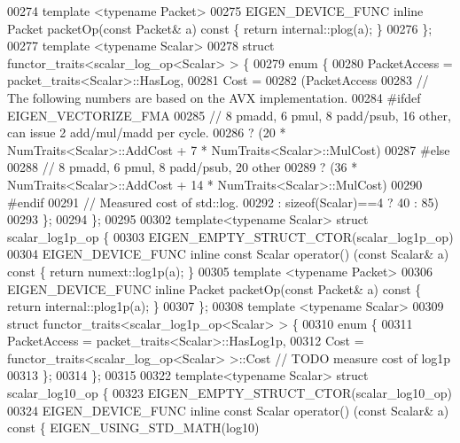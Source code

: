 \begin{DoxyCode}
00274   \textcolor{keyword}{template} <\textcolor{keyword}{typename} Packet>
00275   EIGEN\_DEVICE\_FUNC \textcolor{keyword}{inline} Packet packetOp(\textcolor{keyword}{const} Packet& a)\textcolor{keyword}{ const }\{ \textcolor{keywordflow}{return} internal::plog(a); \}
00276 \};
00277 \textcolor{keyword}{template} <\textcolor{keyword}{typename} Scalar>
00278 \textcolor{keyword}{struct }functor\_traits<scalar\_log\_op<Scalar> > \{
00279   \textcolor{keyword}{enum} \{
00280     PacketAccess = packet\_traits<Scalar>::HasLog,
00281     Cost =
00282     (PacketAccess
00283      \textcolor{comment}{// The following numbers are based on the AVX implementation.}
00284 \textcolor{preprocessor}{#ifdef EIGEN\_VECTORIZE\_FMA}
00285      \textcolor{comment}{// 8 pmadd, 6 pmul, 8 padd/psub, 16 other, can issue 2 add/mul/madd per cycle.}
00286      ? (20 * NumTraits<Scalar>::AddCost + 7 * NumTraits<Scalar>::MulCost)
00287 #\textcolor{keywordflow}{else}
00288      \textcolor{comment}{// 8 pmadd, 6 pmul, 8 padd/psub, 20 other}
00289      ? (36 * NumTraits<Scalar>::AddCost + 14 * NumTraits<Scalar>::MulCost)
00290 \textcolor{preprocessor}{#endif}
00291      \textcolor{comment}{// Measured cost of std::log.}
00292      : \textcolor{keyword}{sizeof}(Scalar)==4 ? 40 : 85)
00293   \};
00294 \};
00295 
00302 \textcolor{keyword}{template}<\textcolor{keyword}{typename} Scalar> \textcolor{keyword}{struct }scalar\_log1p\_op \{
00303   EIGEN\_EMPTY\_STRUCT\_CTOR(scalar\_log1p\_op)
00304   EIGEN\_DEVICE\_FUNC \textcolor{keyword}{inline} \textcolor{keyword}{const} Scalar operator() (\textcolor{keyword}{const} Scalar& a)\textcolor{keyword}{ const }\{ \textcolor{keywordflow}{return} numext::log1p(a); \}
00305   \textcolor{keyword}{template} <\textcolor{keyword}{typename} Packet>
00306   EIGEN\_DEVICE\_FUNC \textcolor{keyword}{inline} Packet packetOp(\textcolor{keyword}{const} Packet& a)\textcolor{keyword}{ const }\{ \textcolor{keywordflow}{return} internal::plog1p(a); \}
00307 \};
00308 \textcolor{keyword}{template} <\textcolor{keyword}{typename} Scalar>
00309 \textcolor{keyword}{struct }functor\_traits<scalar\_log1p\_op<Scalar> > \{
00310   \textcolor{keyword}{enum} \{
00311     PacketAccess = packet\_traits<Scalar>::HasLog1p,
00312     Cost = functor\_traits<scalar\_log\_op<Scalar> >::Cost \textcolor{comment}{// TODO measure cost of log1p}
00313   \};
00314 \};
00315 
00322 \textcolor{keyword}{template}<\textcolor{keyword}{typename} Scalar> \textcolor{keyword}{struct }scalar\_log10\_op \{
00323   EIGEN\_EMPTY\_STRUCT\_CTOR(scalar\_log10\_op)
00324   EIGEN\_DEVICE\_FUNC \textcolor{keyword}{inline} \textcolor{keyword}{const} Scalar operator() (\textcolor{keyword}{const} Scalar& a)\textcolor{keyword}{ const }\{ EIGEN\_USING\_STD\_MATH(log10) \textcolor{keywordflow}{
}
\end{DoxyCode}
